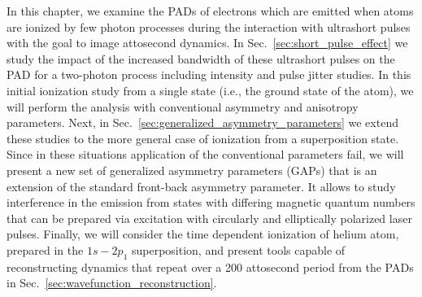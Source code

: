 In this chapter, we examine the PADs of electrons which are emitted when atoms are ionized by few photon processes during the interaction with ultrashort pulses with the goal to image attosecond dynamics. In Sec.~\ref{sec:short_pulse_effect} we study the impact of the increased bandwidth of these ultrashort pulses on the PAD for a two-photon process including intensity and pulse jitter studies. In this initial ionization study from a single state (i.e., the ground state of the atom), we will perform the analysis with conventional asymmetry and anisotropy parameters. Next, in Sec.~\ref{sec:generalized_asymmetry_parameters} we extend these studies to the more general case of ionization from a superposition state. Since in these situations application of the conventional parameters fail, we will present a new set of generalized asymmetry parameters (GAPs) that is an extension of the standard front-back asymmetry parameter.  It allows to study interference in the emission from states with differing magnetic quantum numbers that can be prepared via excitation with circularly and elliptically polarized laser pulses. 
Finally, we will consider the time dependent ionization of helium atom, prepared in the $1s-2p_1$ superposition, and present tools capable of reconstructing dynamics that repeat over a 200 attosecond period from the PADs in Sec.~\ref{sec:wavefunction_reconstruction}.

